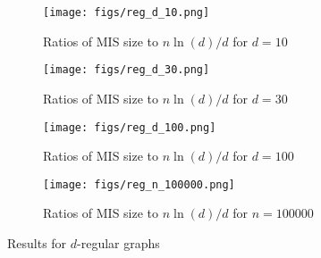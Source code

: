 \begin{figure}
    \centering
    \begin{subfigure}[b]{0.45\linewidth}
        \texttt{[image: figs/reg\_d\_10.png]}
        \caption{Ratios of MIS size to $n\ln(d)/d$ for $d=10$}
        \label{fig:reg_d_10}
    \end{subfigure}
    \hfill
    \begin{subfigure}[b]{0.45\linewidth}
        \texttt{[image: figs/reg\_d\_30.png]}
        \caption{Ratios of MIS size to $n\ln(d)/d$ for $d=30$}
        \label{fig:reg_d_30}
    \end{subfigure}
    \hfill
    \begin{subfigure}[b]{0.45\linewidth}
        \texttt{[image: figs/reg\_d\_100.png]}
        \caption{Ratios of MIS size to $n\ln(d)/d$ for $d=100$}
        \label{fig:reg_d_100}
    \end{subfigure}
    \hfill
    \begin{subfigure}[b]{0.45\linewidth}
        \texttt{[image: figs/reg\_n\_100000.png]}
        \caption{Ratios of MIS size to $n\ln(d)/d$ for $n=100000$}
        \label{fig:reg_n_100000}
    \end{subfigure}
    \caption{Results for $d$-regular graphs}
    \label{fig:regular}
\end{figure}
